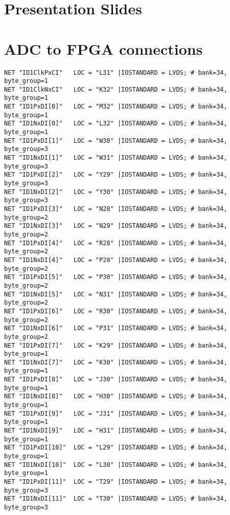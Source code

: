 \begin{appendix}
  \chapter{Presentation Slides}
  

  \chapter{ADC to FPGA connections}
  \label{app:app_adc_fpga_con}
\begin{verbatim}
NET "ID1ClkPxCI"   LOC = "L31" |IOSTANDARD = LVDS; # bank=34, byte_group=1
NET "ID1ClkNxCI"   LOC = "K32" |IOSTANDARD = LVDS; # bank=34, byte_group=1
NET "ID1PxDI[0]"   LOC = "M32" |IOSTANDARD = LVDS; # bank=34, byte_group=1
NET "ID1NxDI[0]"   LOC = "L32" |IOSTANDARD = LVDS; # bank=34, byte_group=1
NET "ID1PxDI[1]"   LOC = "W30" |IOSTANDARD = LVDS; # bank=34, byte_group=3
NET "ID1NxDI[1]"   LOC = "W31" |IOSTANDARD = LVDS; # bank=34, byte_group=3
NET "ID1PxDI[2]"   LOC = "Y29" |IOSTANDARD = LVDS; # bank=34, byte_group=3
NET "ID1NxDI[2]"   LOC = "Y30" |IOSTANDARD = LVDS; # bank=34, byte_group=3
NET "ID1PxDI[3]"   LOC = "N28" |IOSTANDARD = LVDS; # bank=34, byte_group=2
NET "ID1NxDI[3]"   LOC = "N29" |IOSTANDARD = LVDS; # bank=34, byte_group=2
NET "ID1PxDI[4]"   LOC = "R28" |IOSTANDARD = LVDS; # bank=34, byte_group=2
NET "ID1NxDI[4]"   LOC = "P28" |IOSTANDARD = LVDS; # bank=34, byte_group=2
NET "ID1PxDI[5]"   LOC = "P30" |IOSTANDARD = LVDS; # bank=34, byte_group=2
NET "ID1NxDI[5]"   LOC = "N31" |IOSTANDARD = LVDS; # bank=34, byte_group=2
NET "ID1PxDI[6]"   LOC = "R30" |IOSTANDARD = LVDS; # bank=34, byte_group=2
NET "ID1NxDI[6]"   LOC = "P31" |IOSTANDARD = LVDS; # bank=34, byte_group=2
NET "ID1PxDI[7]"   LOC = "K29" |IOSTANDARD = LVDS; # bank=34, byte_group=1
NET "ID1NxDI[7]"   LOC = "K30" |IOSTANDARD = LVDS; # bank=34, byte_group=1
NET "ID1PxDI[8]"   LOC = "J30" |IOSTANDARD = LVDS; # bank=34, byte_group=1
NET "ID1NxDI[8]"   LOC = "H30" |IOSTANDARD = LVDS; # bank=34, byte_group=1
NET "ID1PxDI[9]"   LOC = "J31" |IOSTANDARD = LVDS; # bank=34, byte_group=1
NET "ID1NxDI[9]"   LOC = "H31" |IOSTANDARD = LVDS; # bank=34, byte_group=1
NET "ID1PxDI[10]"  LOC = "L29" |IOSTANDARD = LVDS; # bank=34, byte_group=1
NET "ID1NxDI[10]"  LOC = "L30" |IOSTANDARD = LVDS; # bank=34, byte_group=1
NET "ID1PxDI[11]"  LOC = "T29" |IOSTANDARD = LVDS; # bank=34, byte_group=3
NET "ID1NxDI[11]"  LOC = "T30" |IOSTANDARD = LVDS; # bank=34, byte_group=3

\end{verbatim}
\end{appendix}
